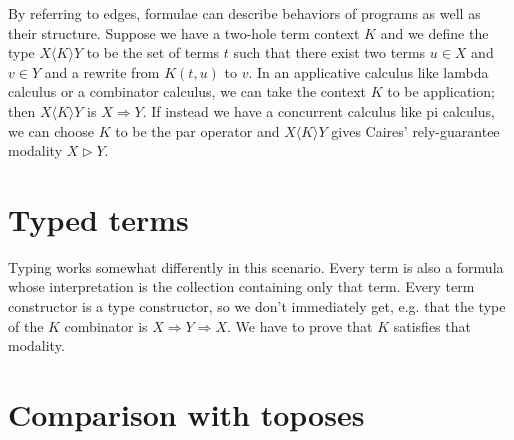 \documentclass[sigplan,9pt,review,anonymous]{acmart}\settopmatter{printfolios=true,printccs=false,printacmref=false}
\begin{document}
By referring to edges, formulae can describe behaviors of programs as well as their structure.  Suppose we have a two-hole term context $K$ and we define the type $X\langle K\rangle Y$ to be the set of terms $t$ such that there exist two terms $u\in X$ and $v \in Y$ and a rewrite from $K(t,u)$ to $v.$  In an applicative calculus like lambda calculus or a combinator calculus, we can take the context $K$ to be application; then $X\langle K\rangle Y$ is $X \Rightarrow Y.$  If instead we have a concurrent calculus like pi calculus, we can choose $K$ to be the par operator and $X\langle K\rangle Y$ gives Caires' rely-guarantee modality $X\triangleright Y$.


\section{Typed terms}
Typing works somewhat differently in this scenario.  Every term is also a formula whose interpretation is the collection containing only that term.  Every term constructor is a type constructor, so we don't immediately get, e.g. that the type of the $K$ combinator is $X \Rightarrow Y \Rightarrow X.$  We have to prove that $K$ satisfies that modality.


\section{Comparison with toposes}

\end{document}
